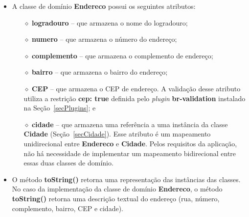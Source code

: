 \begin{itemize}

\item A classe de domínio {\bf Endereco} possui os seguintes atributos:

\vspace{0.5cm}

\begin{itemize}

\item[$\diamond$] {\bf logradouro} -- que armazena o nome do logradouro;

\vspace{0.5cm}

\item[$\diamond$] {\bf numero} -- que armazena o número do endereço;

\vspace{0.5cm}

\item[$\diamond$] {\bf complemento} -- que armazena o complemento de endereço;

\vspace{0.5cm}

\item[$\diamond$] {\bf bairro} -- que armazena o bairro do endereço;

\vspace{0.5cm}

\item[$\diamond$] {\bf CEP} -- que armazena o CEP de endereço. A validação desse
  atributo utiliza a  restrição {\bf cep: true} definida  pelo {\it plugin} {\bf
    br-validation} instalado na Seção~\ref{secPlugins}; e

\vspace{0.5cm}

\item[$\diamond$] {\bf cidade} -- que armazena uma referência a uma instância da
  classe  {\bf Cidade}  (Seção~\ref{secCidade}). Esse  atributo é  um mapeamento
  unidirecional  entre  {\bf Endereco}  e  {\bf  Cidade}.   Pelos requisitos  da
  aplicação, não há necessidade  de implementar um mapeamento bidirecional entre
  essas duas classes de domínio.  

\end{itemize}

\vspace{0.5cm}

\item O  método {\bf  toString()} retorna uma  representação das  instâncias das
  classes.   No caso da  implementação da  classe de  domínio {\bf  Endereco}, o
  método  {\bf  toString()} retorna  uma  descrição  textual  do endereço  (rua,
  número, complemento, bairro, CEP e cidade).

\end{itemize}

